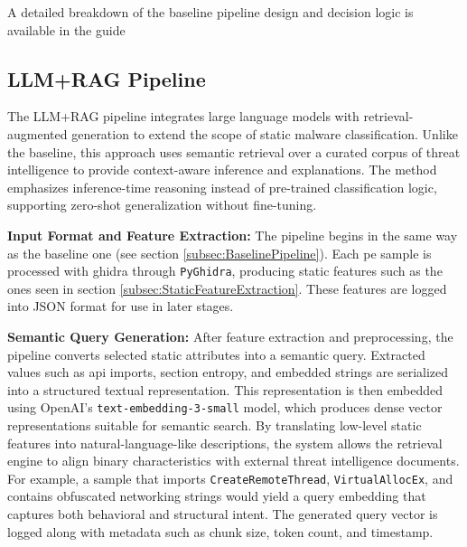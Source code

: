 \vspace{0.5em}
\noindent A detailed breakdown of the baseline pipeline design and decision logic is available
in the guide~\cite{rexisBaselinePipeline}

\subsection{LLM+RAG Pipeline}\label{subsec:LLMRAGPipeline}
The LLM+RAG pipeline integrates large language models with retrieval-augmented generation to extend
the scope of static malware classification. Unlike the baseline, this approach uses semantic
retrieval over a curated corpus of threat intelligence to provide context-aware inference and
explanations. The method emphasizes inference-time reasoning instead of pre-trained classification
logic, supporting zero-shot generalization without fine-tuning.

\vspace{0.5em}
\noindent\textbf{Input Format and Feature Extraction:} The pipeline begins in
the same way as the baseline one (see section \ref{subsec:BaselinePipeline}).
Each \gls{pe} sample is processed with \gls{ghidra} through \texttt{PyGhidra},
producing static features such as the ones seen in section \ref{subsec:StaticFeatureExtraction}.
These features are logged into JSON format for use in later stages.

\vspace{0.5em}
\noindent\textbf{Semantic Query Generation:}
After feature extraction and preprocessing, the pipeline converts selected static attributes into a
semantic query. Extracted values such as \gls{api} imports, section entropy, and embedded strings are
serialized into a structured textual representation. This representation is then embedded using
OpenAI’s \texttt{text-embedding-3-small} model, which produces dense vector representations
suitable for semantic search. By translating low-level static features into natural-language-like
descriptions, the system allows the retrieval engine to align binary characteristics with external
threat intelligence documents. For example, a sample that imports \texttt{CreateRemoteThread},
\texttt{VirtualAllocEx}, and contains obfuscated networking strings would yield a query embedding
that captures both behavioral and structural intent. The generated query vector is logged along
with metadata such as chunk size, token count, and timestamp.


